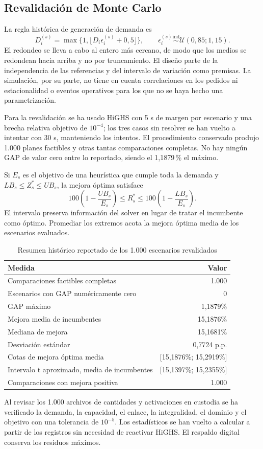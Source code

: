 \documentclass[12pt,a4paper,oneside]{article}
\begin{document}
\subsection{Revalidación de Monte Carlo}
La regla histórica de generación de demanda es
\[
D_i^{(s)}=\max\{1,\lfloor D_i\epsilon_i^{(s)}+0,5\rfloor\},\qquad
\epsilon_i^{(s)}\overset{\mathrm{ind}}{\sim}\mathcal U(0,85;1,15).
\]
El redondeo se lleva a cabo al entero más cercano, de modo que los medios se redondean hacia arriba y no por truncamiento. El diseño parte de la independencia de las referencias y del intervalo de variación como premisas. La simulación, por su parte, no tiene en cuenta correlaciones en los pedidos ni estacionalidad o eventos operativos para los que no se haya hecho una parametrización.

Para la revalidación se ha usado HiGHS con 5 s de margen por escenario y una brecha relativa objetivo de $10^{-4}$; los tres casos sin resolver se han vuelto a intentar con 30 s, manteniendo los intentos. El procedimiento conservado produjo 1.000 planes factibles y otras tantas comparaciones completas. No hay ningún GAP de valor cero entre lo reportado, siendo el 1,1879\,\% el máximo.

Si $E_s$ es el objetivo de una heurística que cumple toda la demanda y $LB_s\leq Z_s^*\leq UB_s$, la mejora óptima satisface
\[
100\left(1-\frac{UB_s}{E_s}\right)\leq R_s^*
\leq100\left(1-\frac{LB_s}{E_s}\right).
\]
El intervalo preserva información del solver en lugar de tratar el incumbente como óptimo. Promediar los extremos acota la mejora óptima media de los escenarios evaluados.

\begin{table}[H]\centering\small
\caption{Resumen histórico reportado de los 1.000 escenarios revalidados}
\begin{tabular}{lr}\toprule
Medida & Valor\\\midrule
Comparaciones factibles completas&1.000\\
Escenarios con GAP numéricamente cero&0\\
GAP máximo&1,1879\%\\
Mejora media de incumbentes&15,1876\%\\
Mediana de mejora&15,1681\%\\
Desviación estándar&0,7724 p.p.\\
Cotas de mejora óptima media&[15,1876\%; 15,2919\%]\\
Intervalo t aproximado, media de incumbentes&[15,1397\%; 15,2355\%]\\
Comparaciones con mejora positiva&1.000\\\bottomrule
\end{tabular}
\end{table}
Al revisar los 1.000 archivos de cantidades y activaciones en custodia se ha verificado la demanda, la capacidad, el enlace, la integralidad, el dominio y el objetivo con una tolerancia de $10^{-5}$. Los estadísticos se han vuelto a calcular a partir de los registros sin necesidad de reactivar HiGHS. El respaldo digital conserva los residuos máximos.
\end{document}
